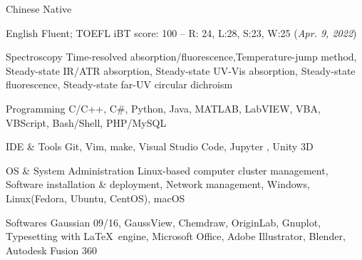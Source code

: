 


\begin{cvskills}


\cvskill
{Chinese} %
{Native} %


\cvskill
{English}
{Fluent; TOEFL iBT score: 100 -- R: 24, L:28, S:23, W:25 (\textit{Apr. 9, 2022})}

\end{cvskills}




\begin{cvskills}


\cvskill
{Spectroscopy} %
{Time-resolved absorption/fluorescence,Temperature-jump method, Steady-state IR/ATR absorption, Steady-state UV-Vis absorption, Steady-state fluorescence, Steady-state far-UV circular dichroism} %


\cvskill
{Programming}
{C/C++, C\#, Python, Java, MATLAB, LabVIEW, VBA, VBScript, Bash/Shell, PHP/MySQL}


\cvskill
{IDE \& Tools}
{Git, Vim, make, Visual Studio Code, Jupyter , Unity 3D}


\cvskill
{OS \& System Administration}
{Linux-based computer cluster management, Software installation \& deployment, Network management, Windows, Linux(Fedora, Ubuntu, CentOS), macOS}


\cvskill
{Softwares}
{Gaussian 09/16, GaussView, Chemdraw, OriginLab, Gnuplot, Typesetting with \LaTeX\ engine, Microsoft Office, Adobe Illustrator, Blender, Autodesk Fusion 360}


\end{cvskills}